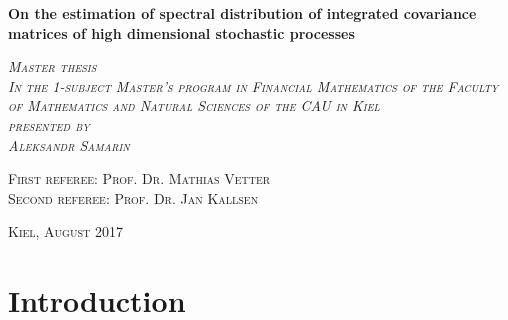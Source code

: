 \documentclass[a4paper,11pt]{book}
\date{}
\author{}
\theoremstyle{plain}
\theoremstyle{definition}
\begin{document}
	\begin{titlepage}
		\centering
		{\huge\bfseries On the estimation of spectral distribution of integrated covariance matrices of high dimensional stochastic processes\par}
		\vspace{2cm}
		{\Large\itshape \textsc{ Master thesis \\
			\bigskip 
			In the 1-subject Master's program in Financial Mathematics of the Faculty of Mathematics and Natural Sciences of the CAU in Kiel \\
			\bigskip 
			presented by \\
			Aleksandr Samarin}}
		\vfill
		\raggedright
		\large
		\textsc{First referee: Prof. Dr. Mathias Vetter} \\
		\bigskip 
		\bigskip
		\textsc{Second referee: Prof. Dr. Jan Kallsen} \\
		\vfill
		\centering
		{\large \textsc{Kiel, August 2017} \par}
	\end{titlepage}

	
	\normalsize
	
	\tableofcontents
	
	\chapter{Introduction}
	
\end{document}
